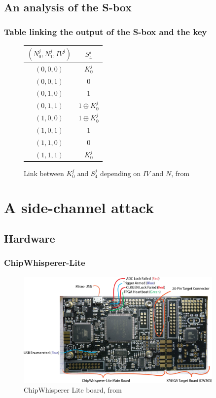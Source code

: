 \documentclass{beamer}
\begin{document}
	\subsection{An analysis of the S-box}
	\begin{frame}
		\frametitle{Table linking the output of the S-box and the key}
		\begin{figure}[h]
			\centering
			\begin{tabular}{|c|c|}
				\hline
				$(N_0^j,N_1^j,IV^j)$&$S_4^j$\\
				\hline\hline
				$(0,0,0)$&$K_0^j$\\
				\hline
				$(0,0,1)$&$0$\\
				\hline
				$(0,1,0)$&$1$\\
				\hline
				$(0,1,1)$&$1 \oplus K_0^j$\\
				\hline
				$(1,0,0)$&$1 \oplus K_0^j$\\
				\hline
				$(1,0,1)$&$1$\\
				\hline
				$(1,1,0)$&$0$\\
				\hline
				$(1,1,1)$&$K_0^j$\\
				\hline
			\end{tabular}
			\caption{Link between $K_0^j$ and $S_4^j$ depending on $IV$ and $N$, from \cite{these}}
			\label{link_k_s4}
		\end{figure}
	\end{frame}
	
	\section{A side-channel attack}
	\subsection{Hardware}
	\begin{frame}
		\frametitle{ChipWhisperer-Lite}
		\begin{figure}[h]
			\raggedright
			\includegraphics[width=0.9\textwidth]{img_files/cwlite_basic1}
			\caption{ChipWhisperer Lite board, from \cite{cwdoc}}
			\label{fig:cw}
		\end{figure}
	\end{frame}
\end{document}
